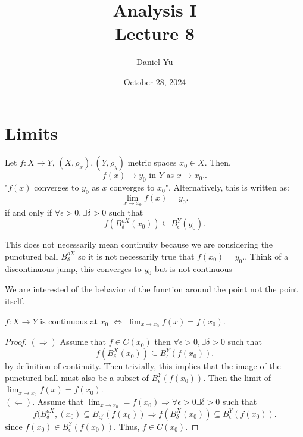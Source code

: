 \documentclass[a4paper]{article}
\title{\Huge{Analysis I} \\ Lecture 8}
\author{\huge{Daniel Yu}}
\date{October 28, 2024}
\begin{document}
\maketitle
\newpage%
\tableofcontents
\pagebreak
\section{Limits}

\begin{definition}
  Let $f: X \to Y$,  $(X, \rho_{x}),(Y, \rho_{y})$ metric spaces $x_0 \in X$. Then,
   \[
  f(x) \to y_0 \text{ in $Y$ as $x \to x_0$.}
  .\] "$f(x)$ converges to  $y_0$ as $x$ converges to  $x_0$". Alternatively, this is written as:
  \[
  \lim_{x \to x_0} f(x) = y_0
  .\] 
  if and only if $\forall \epsilon > 0, \exists \delta > 0$ such that 
  \[
  f(B_{\delta}^{o X} (x_0)) \subseteq B_{\epsilon}^{Y} (y_0)
  .\] 

  \begin{note}
    This does not necessarily mean continuity because we are considering the punctured ball  $B_{\delta}^{o X}$ so it is not necessarily true that $f(x_0) = y_0$., Think of a discontinuous jump, this converges to $y_0$ but is not continuous
  \end{note}
  \begin{remark}
    We are interested of the behavior of the function around the point not the point itself. 
  \end{remark}
\end{definition}
 
\begin{prop}
  $f:X\to Y$ is continuous at  $x_0$ $\iff$ $\lim_{x \to x_0} f(x) = f(x_0)$. 

  \begin{proof}
    $\left( \Rightarrow \right) $ Assume that $f \in C(x_0)$ then $\forall \epsilon > 0, \exists \delta > 0$ such that 
    \[
    f(B_{\delta}^{X} (x_0)) \subseteq B_{\epsilon}^{Y} (f(x_0))
    .\] by definition of continuity. Then trivially, this implies that the image of the punctured ball must also be a subset of  $B_{\epsilon}^{Y} (f(x_0))$. Then the limit of $\lim_{x \to x_0} f(x) = f(x_0)$. \\


    $\left( \Leftarrow \right) $. Assume that $\lim_{x\to x_0} = f(x_0) \Rightarrow \forall \epsilon > 0 \exists \delta >0$ such that 
    \[
    f(B_{\delta}^{o X}, (x_0) \subseteq B_{\epsilon}_{\epsilon}^{Y} (f(x_0)) \Rightarrow f(B_{\delta}^{X} (x_0)) \subseteq B_{\epsilon}^{Y} (f(x_0))
    .\] 
    since $f(x_0) \in B_{\epsilon}^{Y} (f(x_0))$. Thus, $f \in C(x_0)$.  
  \end{proof}
\end{prop}
\end{document}
